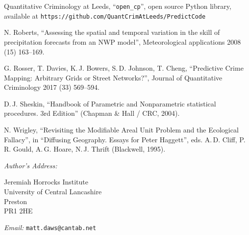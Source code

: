 \documentclass[twoside,a4paper,twocolumn,10pt]{article}
\theoremstyle{plain}
\theoremstyle{definition}
\begin{document}
\begin{thebibliography}{99}
 Quantitative Criminology at Leeds, ``\texttt{open\_cp}'',
   open source Python library, available at \texttt{https://github.com/QuantCrimAtLeeds/PredictCode}

 N. Roberts, ``Assessing the spatial and temporal variation in the skill of
	precipitation forecasts from an NWP model'',
	Meteorological applications 2008 (15) 163--169.

 G. Rosser, T. Davies, K.\,J. Bowers, S.\,D. Johnson, T. Cheng,
	``Predictive Crime Mapping: Arbitrary Grids or Street Networks?'',
	Journal of Quantitative Criminology 2017 (33) 569--594.

 D.\,J. Sheskin,
        ``Handbook of Parametric and Nonparametric statistical procedures.  3rd Edition''
        (Chapman \& Hall / CRC, 2004).

 N. Wrigley, ``Revisiting the Modifiable Areal Unit Problem and the Ecological Fallacy'',
        in ``Diffusing Geography.  Essays for Peter Haggett'', eds. A.\,D. Cliff,
        P.\,R. Gould, A.\,G. Hoare, N.\,J. Thrift (Blackwell, 1995).

\end{thebibliography}


\vspace{5ex}

\noindent\emph{Author's Address:}
\parbox[t]{3in}{Jeremiah Horrocks Institute\\
University of Central Lancashire\\
Preston\\
PR1 2HE}

\bigskip\noindent\emph{Email:} \texttt{matt.daws@cantab.net}
\end{document}
